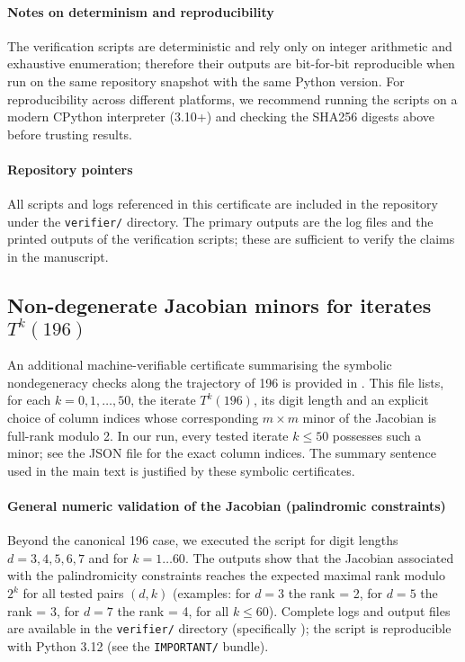 \documentclass[12pt,a4paper]{article}
\begin{document}
\paragraph{Notes on determinism and reproducibility}
The verification scripts are deterministic and rely only on integer arithmetic
and exhaustive enumeration; therefore their outputs are bit-for-bit
reproducible when run on the same repository snapshot with the same Python
version. For reproducibility across different platforms, we recommend running
the scripts on a modern CPython interpreter (3.10+) and checking the SHA256
digests above before trusting results.

\paragraph{Repository pointers}
All scripts and logs referenced in this certificate are included in the
repository under the \texttt{verifier/} directory. The primary outputs are the
log files \texttt{} and the printed outputs of the
verification scripts; these are sufficient to verify the claims in the
manuscript.

\subsection*{Non-degenerate Jacobian minors for iterates $T^k(196)$}
An additional machine-verifiable certificate summarising the symbolic
nondegeneracy checks along the trajectory of 196 is provided in
												     										\texttt{}. This file lists, for each
$k=0,1,\dots,50$, the iterate $T^k(196)$, its digit length and an explicit
choice of column indices whose corresponding $m\times m$ minor of the
Jacobian is full-rank modulo 2. In our run, every tested iterate $k\le 50$
possesses such a minor; see the JSON file for the exact column indices. The
summary sentence used in the main text is justified by these symbolic
certificates.

\paragraph{General numeric validation of the Jacobian (palindromic constraints)}
Beyond the canonical 196 case, we executed the script
	    																											\texttt{} for digit lengths
$d=3,4,5,6,7$ and for $k=1\ldots60$. The outputs show that the Jacobian
associated with the palindromicity constraints reaches the expected maximal
rank modulo $2^k$ for all tested pairs $(d,k)$ (examples: for $d=3$ the rank
= 2, for $d=5$ the rank = 3, for $d=7$ the rank = 4, for all $k\le60$).
Complete logs and output files are available in the \texttt{verifier/}
directory (specifically \texttt{});
the script is reproducible with Python 3.12 (see the \texttt{IMPORTANT/}
bundle).
\end{document}
